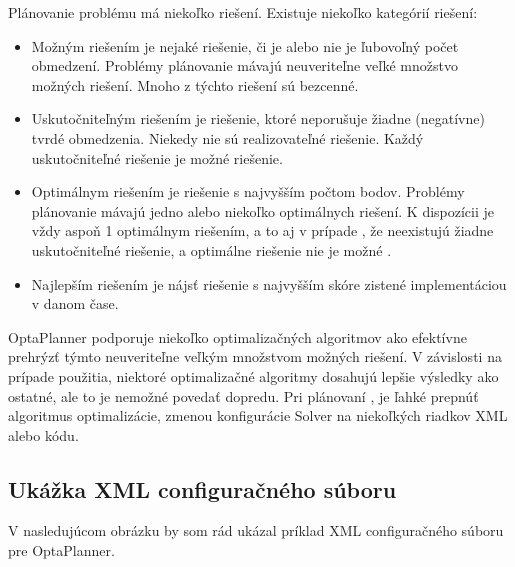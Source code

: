 Plánovanie problému má niekoľko riešení. Existuje niekoľko kategórií riešení:
\begin{itemize}
\item Možným riešením je nejaké riešenie, či je alebo nie je ľubovoľný počet obmedzení. Problémy plánovanie mávajú neuveriteľne veľké množstvo možných riešení. Mnoho z týchto riešení sú bezcenné.
\item Uskutočniteľným riešením je riešenie, ktoré neporušuje žiadne (negatívne) tvrdé obmedzenia. Niekedy nie sú realizovateľné riešenie. Každý uskutočniteľné riešenie je možné riešenie.

\item Optimálnym riešením je riešenie s najvyšším počtom bodov. Problémy plánovanie mávajú jedno alebo niekoľko optimálnych riešení. K dispozícii je vždy aspoň 1 optimálnym riešením, a to aj v prípade , že neexistujú žiadne uskutočniteľné riešenie, a optimálne riešenie nie je možné .
\item Najlepším riešením je nájsť riešenie s najvyšším skóre zistené implementáciou v danom čase.

\end{itemize}

OptaPlanner podporuje niekoľko optimalizačných algoritmov ako efektívne prehrýzť týmto neuveriteľne veľkým množstvom možných riešení. V závislosti na prípade použitia, niektoré optimalizačné algoritmy dosahujú lepšie výsledky ako ostatné, ale to je nemožné povedať dopredu. Pri plánovaní , je ľahké prepnúť algoritmus optimalizácie, zmenou konfigurácie Solver na niekoľkých riadkov XML alebo kódu.


\newpage
\subsection{Ukážka XML configuračného súboru}
V nasledujúcom obrázku by som rád ukázal príklad XML configuračného súboru pre OptaPlanner.
    

